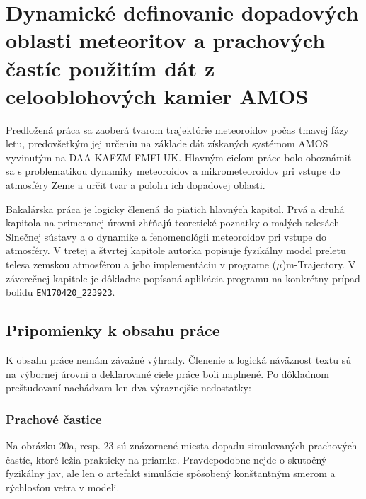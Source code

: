 \hypertarget{dynamickuxe9-definovanie-dopadovuxfdch-oblasti-meteoritov-a-prachovuxfdch-ux10dastuxedc-pouux17eituxedm-duxe1t-z-celooblohovuxfdch-kamier-amos}{%
\section{Dynamické definovanie dopadových oblasti meteoritov a
prachových častíc použitím dát z celooblohových kamier
AMOS}\label{dynamickuxe9-definovanie-dopadovuxfdch-oblasti-meteoritov-a-prachovuxfdch-ux10dastuxedc-pouux17eituxedm-duxe1t-z-celooblohovuxfdch-kamier-amos}}

Predložená práca sa zaoberá tvarom trajektórie meteoroidov počas tmavej
fázy letu, predovšetkým jej určeniu na základe dát získaných systémom
AMOS vyvinutým na DAA KAFZM FMFI UK. Hlavným cieľom práce bolo oboznámiť
sa s problematikou dynamiky meteoroidov a mikrometeoroidov pri vstupe do
atmosféry Zeme a určiť tvar a polohu ich dopadovej oblasti.

Bakalárska práca je logicky členená do piatich hlavných kapitol. Prvá a
druhá kapitola na primeranej úrovni zhŕňajú teoretické poznatky o malých
telesách Slnečnej sústavy a o dynamike a fenomenológii meteoroidov pri
vstupe do atmosféry. V tretej a štvrtej kapitole autorka popisuje
fyzikálny model preletu telesa zemskou atmosférou a jeho implementáciu v
programe (\(\mu\))m-Trajectory. V záverečnej kapitole je dôkladne
popísaná aplikácia programu na konkrétny prípad bolidu
\texttt{EN170420\_223923}.

\hypertarget{pripomienky-k-obsahu-pruxe1ce}{%
\subsection{Pripomienky k obsahu
práce}\label{pripomienky-k-obsahu-pruxe1ce}}

K obsahu práce nemám závažné výhrady. Členenie a logická náväznosť textu
sú na výbornej úrovni a deklarované ciele práce boli naplnené. Po
dôkladnom preštudovaní nachádzam len dva výraznejšie nedostatky:

\hypertarget{prachovuxe9-ux10dastice}{%
\subsubsection{Prachové častice}\label{prachovuxe9-ux10dastice}}

Na obrázku 20a, resp. 23 sú znázornené miesta dopadu simulovaných
prachových častíc, ktoré ležia prakticky na priamke. Pravdepodobne nejde
o skutočný fyzikálny jav, ale len o artefakt simulácie spôsobený
konštantným smerom a rýchlosťou vetra v modeli.

